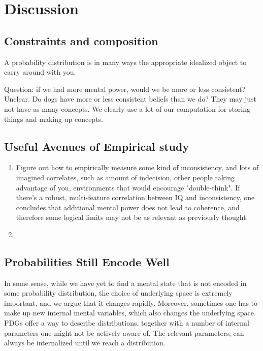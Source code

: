 \documentclass{article}
\numberwithin{equation}{section}
\begin{document}
	\section{Discussion}
	
	\subsection{Constraints and composition}
	
	
	
	A probability distribution is in many ways the appropriate idealized object to carry around with you.
	
	Question: if we had more mental power, would we be more or less consistent? Unclear. Do dogs have more or less consistent beliefs than we do? They may just not have as many concepts. We clearly use a lot of our computation for storing things and making up concepts.
	
	

	
	\begin{vfull}
	\subsection{Useful Avenues of Empirical study}
	
	\begin{enumerate}
		\item Figure out how to empirically measure some kind of inconsistency, and lots of imagined correlates, such as amount of indecision, other people taking advantage of you, environments that would encourage "double-think". If there's a robust, multi-feature correlation between IQ and inconsistency, one concludes that additional mental power does not lead to coherence, and therefore some logical limits may not be as relevant as previously thought.
		\item 
	\end{enumerate}
	\end{vfull}
	
	

	\subsection{Probabilities Still Encode Well}	
	In some sense, while we have yet to find a mental state that is not encoded in some probability distribution, the choice of underlying space is extremely important, and we argue that it changes rapidly. Moreover, sometimes one has to make up new internal mental variables, which also changes the underlying space. PDGs offer a way to describe distributions, together with a number of internal parameters one might not be actively aware of. The relevant parameters, can always be internalized  until we reach a distribution. 
	
\end{document}
